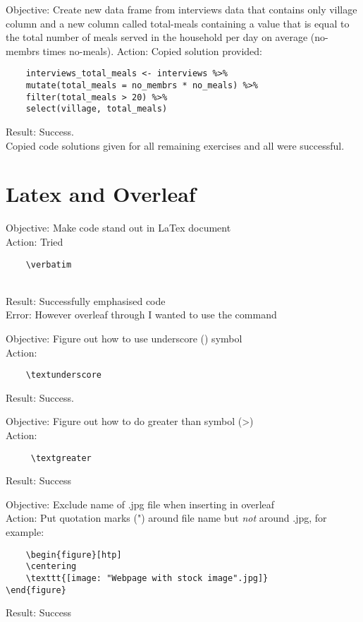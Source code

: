 \documentclass{article}
\begin{document}
Objective: Create new data frame from interviews data that contains only village column and a new column called total-meals containing a value that is equal to the total number of meals served in the household per day on average (no-membrs times no-meals).
Action: Copied solution provided:
\begin{verbatim}
    interviews_total_meals <- interviews %>%
    mutate(total_meals = no_membrs * no_meals) %>%
    filter(total_meals > 20) %>%
    select(village, total_meals)
\end{verbatim}
Result: Success.\\

\noindent* Copied code solutions given for all remaining exercises and all were successful. 

\section{Latex and Overleaf}

Objective: Make code stand out in LaTex document\\
Action: Tried \begin{verbatim}
    \verbatim
\end{verbatim}\\
Result: Successfully emphasised code\\
Error: However overleaf through I wanted to use the command\newline

Objective: Figure out how to use underscore (\textunderscore ) symbol\\
Action: \begin{verbatim}
    \textunderscore 
\end{verbatim}
Result: Success.\newline

Objective: Figure out how to do greater than symbol (\textgreater )\\
Action: \begin{verbatim}
     \textgreater
\end{verbatim} 
Result: Success\newline

Objective: Exclude name of .jpg file when inserting in overleaf\\
Action: Put quotation marks (") around file name but \textit{not} around .jpg, for example: 
\begin{verbatim}
    \begin{figure}[htp]
    \centering
    \texttt{[image: "Webpage with stock image".jpg]}
\end{figure}
\end{verbatim}
Result: Success
\end{document}
